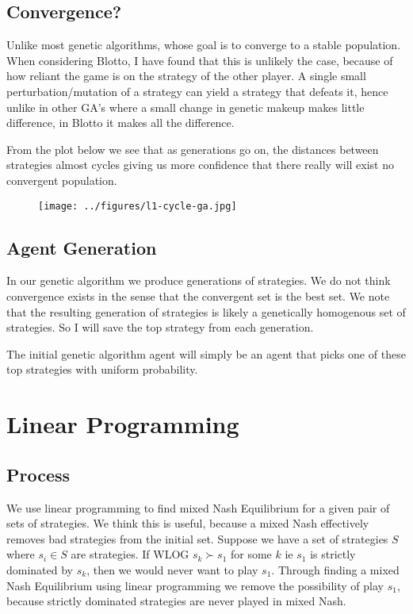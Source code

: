 \documentclass[12pt,letter]{article}
\begin{document}
\subsection{Convergence?}
Unlike most genetic algorithms, whose goal is to converge to a stable population. When considering Blotto, I have found that this is unlikely the case, because of how reliant the game is on the strategy of the other player. A single small perturbation/mutation of a strategy can yield a strategy that defeats it, hence unlike in other GA's where a small change in genetic makeup makes little difference, in Blotto it makes all the difference.

From the plot below we see that as generations go on, the distances between strategies almost cycles giving us more confidence that there really will exist no convergent population.
\begin{figure}[h]
\texttt{[image: ../figures/l1-cycle-ga.jpg]}
\centering
\end{figure}


\subsection{Agent Generation}
In our genetic algorithm we produce generations of strategies. We do not think convergence exists in the sense that the convergent set is the best set. We note that the resulting generation of strategies is likely a genetically homogenous set of strategies. So I will save the top strategy from each generation.

The initial genetic algorithm agent will simply be an agent that picks one of these top strategies with uniform probability.

\section{Linear Programming} %
\subsection{Process}
We use linear programming to find mixed Nash Equilibrium for a given pair of sets of strategies. We think this is useful, because a mixed Nash effectively removes bad strategies from the initial set. Suppose we have a set of strategies $S$ where $s_i \in S$ are strategies. If WLOG $s_k \succ s_1$ for some $k$ ie $s_1$ is strictly dominated by $s_k$, then we would never want to play $s_1$. Through finding a mixed Nash Equilibrium using linear programming we remove the possibility of play $s_1$, because strictly dominated strategies are never played in mixed Nash.
\end{document}
